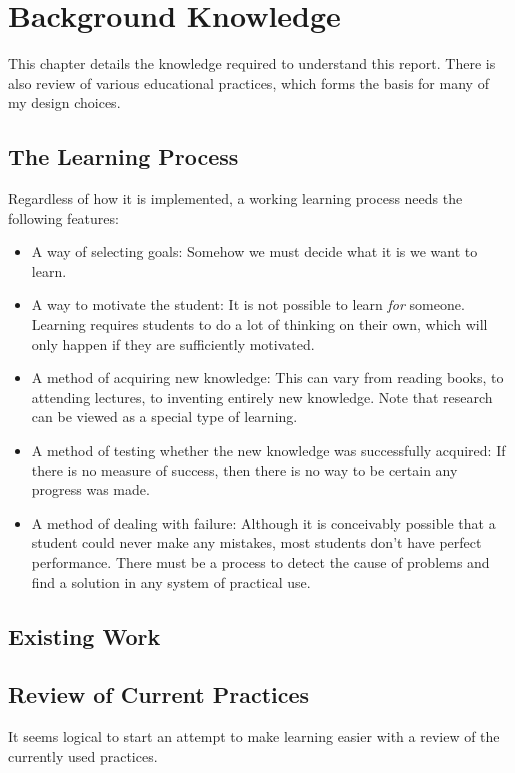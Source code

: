 \chapter{Background Knowledge}
\label{chapter:background}
  This chapter details the knowledge required to understand this report. There is also review of various educational practices, which forms the basis for many of my design choices.

  \section{The Learning Process}
    Regardless of how it is implemented, a working learning process needs the following features:

    \begin{itemize}
      \item A way of selecting goals: Somehow we must decide what it is we want to learn.

      \item A way to motivate the student: It is not possible to learn \emph{for} someone. Learning requires students to do a lot of thinking on their own, which will only happen if they are sufficiently motivated.

      \item A method of acquiring new knowledge: This can vary from reading books, to attending lectures, to inventing entirely new knowledge. Note that research can be viewed as a special type of learning.

      \item A method of testing whether the new knowledge was successfully acquired: If there is no measure of success, then there is no way to be certain any progress was made.

      \item A method of dealing with failure: Although it is conceivably possible that a student could never make any mistakes, most students don't have perfect performance. There must be a process to detect the cause of problems and find a solution in any system of practical use.
    \end{itemize}

  \section{Existing Work}

  \section{Review of Current Practices}
    It seems logical to start an attempt to make learning easier with a review of the currently used practices.

